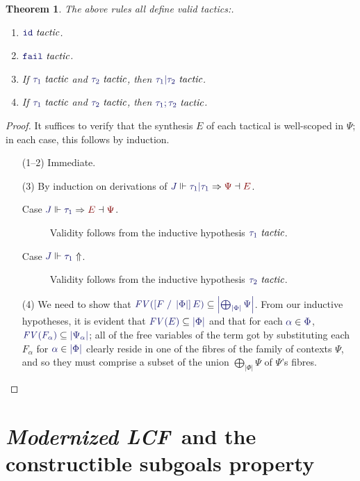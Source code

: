 \documentclass[11pt]{article}
\newtheorem{thm}{Theorem}[section]
\theoremstyle{definition}
\theoremstyle{remark}
\numberwithin{equation}{section}
\def\InputModeColorName{MidnightBlue}
\def\OutputModeColorName{Maroon}
\newcommand\InputMode[1]{{\color{\InputModeColorName}{#1}}}
\newcommand\OutputMode[1]{{\color{\OutputModeColorName}{#1}}}
\newcommand\JJ{J}
\newcommand\IsTac[1]{\InputMode{#1}\ \textit{tactic}}
\newcommand\Refine[4]{\InputMode{#1}\Vdash\InputMode{#2}\Rightarrow\OutputMode{#4}\dashv\OutputMode{#3}}
\newcommand\NoRefine[2]{\InputMode{#1}\Vdash\InputMode{#2}\Uparrow}
\newcommand\Member[2]{\InputMode{#1}\in\InputMode{#2}}
\newcommand\IdTac{\mathtt{id}}
\newcommand\FailTac{\mathtt{fail}}
\newcommand\OrElseTac[2]{#1\vert#2}
\newcommand\ThenTac[2]{#1;#2}
\newcommand\Dom[1]{\left\vert#1\right\vert}
\newcommand\SubsetEq[2]{\InputMode{#1}\subseteq\InputMode{#2}}
\newcommand\FV[1]{\textit{FV}\left(#1\right)}
\newcommand\Subst[3]{\left[#1\;/\;#2\right]#3}
\newcommand\ModLCF{\textbf{\emph{Modernized LCF}}}
\begin{document}
\begin{thm}
  The above rules all define valid tactics:.
  \begin{enumerate}
    \item $\IsTac{\IdTac}$.
    \item $\IsTac{\FailTac}$.
    \item If $\IsTac{\tau_1}$ and $\IsTac{\tau_2}$, then
      $\IsTac{\OrElseTac{\tau_1}{\tau_2}}$.
    \item If $\IsTac{\tau_1}$ and $\IsTac{\tau_2}$, then
      $\IsTac{\ThenTac{\tau_1}{\tau_2}}$.
  \end{enumerate}
\end{thm}
\begin{proof}
  It suffices to verify that the synthesis $E$ of each tactical is well-scoped
  in $\Psi$; in each case, this follows by induction.
  \begin{enumerate}
    \item[(1--2)] Immediate.
    \item[(3)]
      By induction on derivations of
      $\Refine{\JJ}{\OrElseTac{\tau_1}{\tau_1}}{E}{\Psi}$.
      \begin{description}
        \item[Case $\Refine{\JJ}{\tau_1}{\Psi}{E}$.] Validity follows from the
          inductive hypothesis $\IsTac{\tau_1}$.
        \item[Case $\NoRefine{\JJ}{\tau_1}$.] Validity follows from the
          inductive hypothesis $\IsTac{\tau_2}$.
      \end{description}

    \item[(4)] We need to show that
      $\SubsetEq{\FV{\Subst{F}{\Dom\Phi}{E}}}{\Dom{\bigoplus_{\Dom\Phi}\Psi}}$.
      From our inductive hypotheses, it is evident that
      $\SubsetEq{\FV{E}}{\Dom\Phi}$ and that for each $\Member{\alpha}{\Phi}$,
      $\SubsetEq{\FV{F_\alpha}}{\Dom{\Psi_\alpha}}$; all of the free variables
      of the term got by substituting each $F_\alpha$ for
      $\Member{\alpha}{\Dom\Phi}$ clearly reside in one of the fibres of the
      family of contexts $\Psi$, and so they must comprise a subset of the
      union $\bigoplus_{\Dom\Phi}\Psi$ of $\Psi$'s fibres.

  \end{enumerate}
\end{proof}

\section{\ModLCF\ and the constructible subgoals property}
\end{document}
